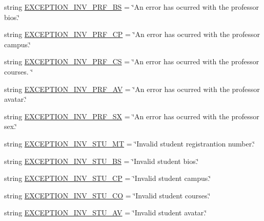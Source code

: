 \begin{DoxyCompactItemize}
\item 
string \hyperlink{namespaceELO_1_1lang_1_1en__us_ab78b3d80fa83e45c905aaa7f826a30d5}{E\-X\-C\-E\-P\-T\-I\-O\-N\-\_\-\-I\-N\-V\-\_\-\-P\-R\-F\-\_\-\-B\-S} = \char`\"{}An error has ocurred with the professor bios.\char`\"{}
\item 
string \hyperlink{namespaceELO_1_1lang_1_1en__us_a61b350a41d3296eb83d6ee50423fe261}{E\-X\-C\-E\-P\-T\-I\-O\-N\-\_\-\-I\-N\-V\-\_\-\-P\-R\-F\-\_\-\-C\-P} = \char`\"{}An error has ocurred with the professor campus.\char`\"{}
\item 
string \hyperlink{namespaceELO_1_1lang_1_1en__us_a5052b678df85ef42c0f2bf0ba0ef1f08}{E\-X\-C\-E\-P\-T\-I\-O\-N\-\_\-\-I\-N\-V\-\_\-\-P\-R\-F\-\_\-\-C\-S} = \char`\"{}An error has ocurred with the professor courses. \char`\"{}
\item 
string \hyperlink{namespaceELO_1_1lang_1_1en__us_ad1304fa54c77b7a098ffb776bfa7503d}{E\-X\-C\-E\-P\-T\-I\-O\-N\-\_\-\-I\-N\-V\-\_\-\-P\-R\-F\-\_\-\-A\-V} = \char`\"{}An error has ocurred with the professor avatar.\char`\"{}
\item 
string \hyperlink{namespaceELO_1_1lang_1_1en__us_a785f2e3fcc914e75710abca2e8ecaba7}{E\-X\-C\-E\-P\-T\-I\-O\-N\-\_\-\-I\-N\-V\-\_\-\-P\-R\-F\-\_\-\-S\-X} = \char`\"{}An error has ocurred with the professor sex.\char`\"{}
\item 
string \hyperlink{namespaceELO_1_1lang_1_1en__us_a710ca968f834e5e09ba88e25e19ed3f7}{E\-X\-C\-E\-P\-T\-I\-O\-N\-\_\-\-I\-N\-V\-\_\-\-S\-T\-U\-\_\-\-M\-T} = \char`\"{}Invalid student registrantion number.\char`\"{}
\item 
string \hyperlink{namespaceELO_1_1lang_1_1en__us_afa48f95d1e0d7769a8058cf22d8be7a7}{E\-X\-C\-E\-P\-T\-I\-O\-N\-\_\-\-I\-N\-V\-\_\-\-S\-T\-U\-\_\-\-B\-S} = \char`\"{}Invalid student bios.\char`\"{}
\item 
string \hyperlink{namespaceELO_1_1lang_1_1en__us_a6cca102299bf80e33f8a1c38fca8f5c4}{E\-X\-C\-E\-P\-T\-I\-O\-N\-\_\-\-I\-N\-V\-\_\-\-S\-T\-U\-\_\-\-C\-P} = \char`\"{}Invalid student campus.\char`\"{}
\item 
string \hyperlink{namespaceELO_1_1lang_1_1en__us_a10eace6109a83ed0b8700ef77d987a17}{E\-X\-C\-E\-P\-T\-I\-O\-N\-\_\-\-I\-N\-V\-\_\-\-S\-T\-U\-\_\-\-C\-O} = \char`\"{}Invalid student courses.\char`\"{}
\item 
string \hyperlink{namespaceELO_1_1lang_1_1en__us_ab7bde9ca24b76eb07075e5edd495838f}{E\-X\-C\-E\-P\-T\-I\-O\-N\-\_\-\-I\-N\-V\-\_\-\-S\-T\-U\-\_\-\-A\-V} = \char`\"{}Invalid student avatar.\char`\"{}
\item 

\end{DoxyCompactItemize}
